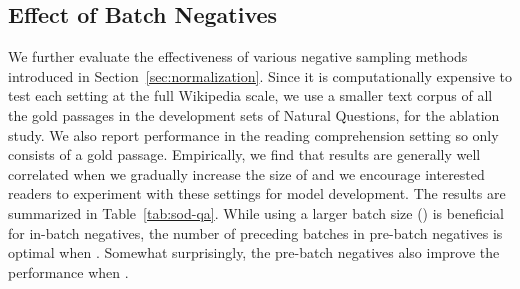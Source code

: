 \documentclass[11pt,a4paper]{article}
\begin{document}
\subsection{Effect of Batch Negatives}\label{sec:semi_od}
We further evaluate the effectiveness of various negative sampling methods introduced in Section~\ref{sec:normalization}.
Since it is computationally expensive to test each setting at the full Wikipedia scale, we use a smaller text corpus  of all the gold passages in the development sets of Natural Questions, for the ablation study.
We also report performance in the reading comprehension setting so  only consists of a gold passage. Empirically, we find that results are generally well correlated when we gradually increase the size of  and we encourage interested readers to experiment with these settings for model development. The results are summarized in Table~\ref{tab:sod-qa}. While using a larger batch size () is beneficial for in-batch negatives, the number of preceding batches in pre-batch negatives is optimal when .
Somewhat surprisingly, the pre-batch negatives also improve the performance when .






\begin{table}[t]
    \centering
    \caption{Effect of in-batch negatives and pre-batch negatives on the development set of Natural Questions. : batch size, : number of preceding mini-batches used in pre-batch negatives. We report EM of our model with smaller sets such as  (all the gold passages in the development set of NQ) and  (single passage).
}\label{tab:sod-qa}\vspace{-0.3cm}
\end{table}
\end{document}
